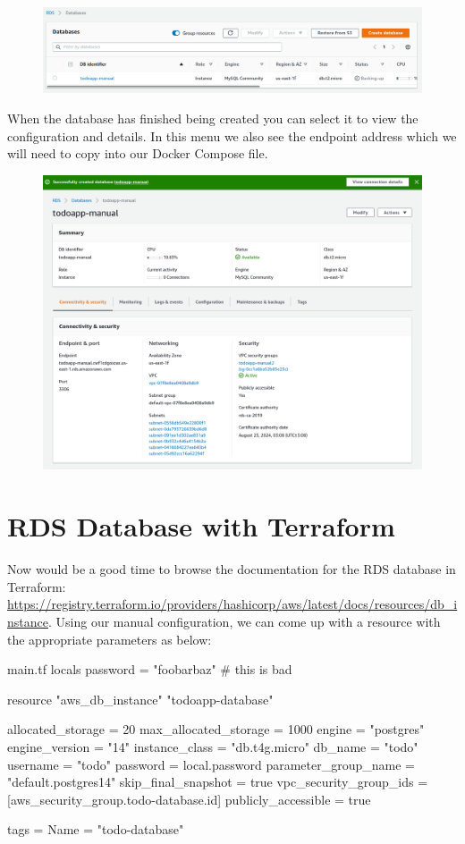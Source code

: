 \documentclass{csse4400}
\begin{document}
\begin{figure}[H]
  \includegraphics[width=\textwidth]{images/aws_4}
\end{figure}

When the database has finished being created you can select it to view the configuration and details. In this menu we also see the endpoint address which we will need to copy into our Docker Compose file.

\begin{figure}[H]
  \includegraphics[width=\textwidth]{images/aws_5}
\end{figure}

\section{RDS Database with Terraform}

Now would be a good time to browse the documentation for the RDS database in Terraform:
\url{https://registry.terraform.io/providers/hashicorp/aws/latest/docs/resources/db_instance}.
Using our manual configuration, we can come up with a resource with the appropriate parameters as below:

\begin{code}[language=terraform,numbers=none]{main.tf}
locals {
  password = "foobarbaz" # this is bad
}

resource "aws_db_instance" "todoapp-database" {
  allocated_storage      = 20
  max_allocated_storage  = 1000
  engine                 = "postgres"
  engine_version         = "14"
  instance_class         = "db.t4g.micro"
  db_name                = "todo"
  username               = "todo"
  password               = local.password
  parameter_group_name   = "default.postgres14"
  skip_final_snapshot    = true
  vpc_security_group_ids = [aws_security_group.todo-database.id]
  publicly_accessible    = true

  tags = {
    Name = "todo-database"
  }
}
\end{code}
\end{document}
